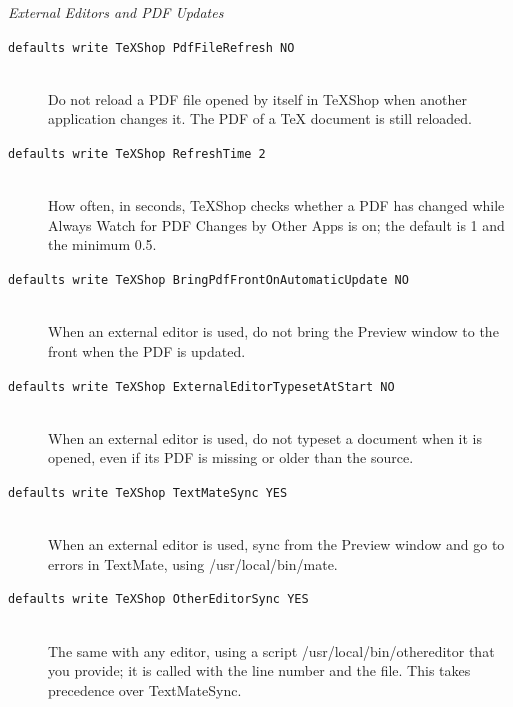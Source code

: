 \documentclass[11pt, oneside]{article}   	%
\begin{document}
{\em External Editors and PDF Updates}
\begin{description}
\item[\texttt{defaults write TeXShop PdfFileRefresh NO}] \hfill \\
Do not reload a PDF file opened by itself in TeXShop when another application changes it. The PDF of a TeX document is still reloaded.
\item[\texttt{defaults write TeXShop RefreshTime 2}] \hfill \\
How often, in seconds, TeXShop checks whether a PDF has changed while Always Watch for PDF Changes by Other Apps is on; the default is 1 and the minimum 0.5.
\item[\texttt{defaults write TeXShop BringPdfFrontOnAutomaticUpdate NO}] \hfill \\
When an external editor is used, do not bring the Preview window to the front when the PDF is updated.
\item[\texttt{defaults write TeXShop ExternalEditorTypesetAtStart NO}] \hfill \\
When an external editor is used, do not typeset a document when it is opened, even if its PDF is missing or older than the source.
\item[\texttt{defaults write TeXShop TextMateSync YES}] \hfill \\
When an external editor is used, sync from the Preview window and go to errors in TextMate, using /usr/local/bin/mate.
\item[\texttt{defaults write TeXShop OtherEditorSync YES}] \hfill \\
The same with any editor, using a script /usr/local/bin/othereditor that you provide; it is called with the line number and the file. This takes precedence over TextMateSync.
\end{description}
\end{document}
